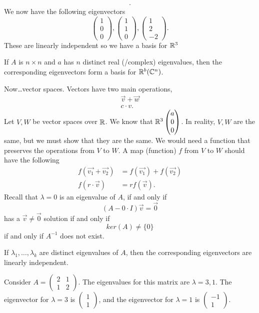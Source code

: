 \begin{eg}
\begin{align*}
  .\end{align*}
  We now have the following eigenvectors 
  \[
  \begin{pmatrix} 1\\0\\0 \end{pmatrix} ,\begin{pmatrix} 1\\1\\0 \end{pmatrix} ,\begin{pmatrix} 1\\2\\-2 \end{pmatrix} 
  .\] 
  These are linearly independent so we have a basis for $\mathbb{R}^3$
\end{eg}
\begin{theorem}
  If $A$ is $n\times n$ and $a$ has $n$ distinct real (/complex) eigenvalues, then the corresponding eigenvectors form a basis for $\mathbb{R}^b(\mathbb{C}^n)$. 
\end{theorem}
Now\ldots vector spaces. Vectors have two main operations,
\begin{align*}
  \vec{v}+\vec{w}\\
  c\cdot v
.\end{align*}
Let $V, W$ be vector spaces over $\mathbb{R}$. We know that $\mathbb{R}^3\begin{pmatrix} a\\0\\0 \end{pmatrix}$. In reality, $V, W$ are the same, but we must show that they are the same. We would need a function that preserves the operations from $V$ to $W$. A map (function) $f$ from $V$ to $W$ should have the following
\begin{align*}
  f(\vec{v_1}+\vec{v_2})&=f(\vec{v_1})+f(\vec{v_2})\\
  f(r\cdot \vec{v})&=rf(\vec{v})
.\end{align*}
Recall that $\lambda=0$ is an eigenvalue of $A$, if and only if
\[
  (A-0\cdot I)\vec{v}=\vec{0}
\] has a $\vec{v}\neq \vec{0}$ solution if and only if 
\[
  ker(A)\neq\{0\}
\] if and only if  $A^{-1}$ does not exist.
\begin{theorem}
  If $\lambda_1,\ldots,\lambda_k$ are distinct eigenvalues of $A$, then the corresponding eigenvectors are linearly independent.
\end{theorem}
\begin{eg}
  Consider $A=\begin{pmatrix} 2&1\\1&2 \end{pmatrix} $. The eigenvalues for this matrix are $\lambda=3,1$. The eigenvector for $\lambda=3$ is $\begin{pmatrix} 1\\1 \end{pmatrix} $, and the eigenvector for $\lambda=1$ is $\begin{pmatrix} -1\\1 \end{pmatrix} $.
\end{eg}
